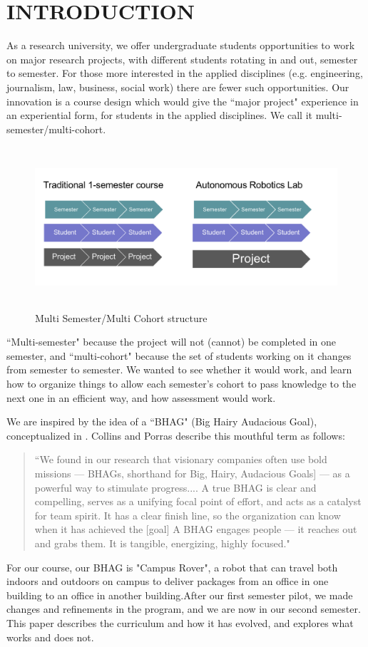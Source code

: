 \section{INTRODUCTION}

As a research university, we offer undergraduate students opportunities to work on major research projects, with different students rotating in and out, semester to semester. For those more interested in the applied disciplines (e.g. engineering, journalism, law, business, social work) there are fewer such opportunities. Our innovation is a course design which would give the ``major project" experience in an experiential form, for students in the applied disciplines. We call it multi-semester/multi-cohort. 

\begin{figure}[!ht]
  \centering
  \includegraphics[width=\columnwidth,height=6cm]{diag1}
  \caption{Multi Semester/Multi Cohort structure}
  \label{fig:diag1}
\end{figure}

``Multi-semester" because the project will not (cannot) be completed in one semester, and ``multi-cohort" because the set of students working on it changes from semester to semester. We wanted to see whether it would work, and learn how to organize things to allow each semester’s cohort to pass knowledge to the next one in an efficient way, and how assessment would work.

We are inspired by the idea of a ``BHAG" (Big Hairy Audacious Goal), conceptualized in \cite{Collins}. Collins and Porras describe this mouthful term as follows:

\begin{quote}
``We found in our research that visionary companies often use bold missions --- BHAGs, shorthand for Big, Hairy, Audacious Goals] --- as a powerful way to stimulate progress.... A true BHAG is clear and compelling, serves as a unifying focal point of effort, and acts as a catalyst for team spirit. It has a clear finish line, so the organization can know when it has achieved the [goal] A BHAG engages people --- it reaches out and grabs them. It is tangible, energizing, highly focused.\cite{Collins}"
\end{quote}

For our course, our BHAG is "Campus Rover", a robot that can travel both indoors and outdoors on campus to deliver packages from an office in one building to an office in another building.After our first semester pilot, we made changes and refinements in the program, and we are now in our second semester. This paper describes the curriculum and how it has evolved, and explores what works and does not.

